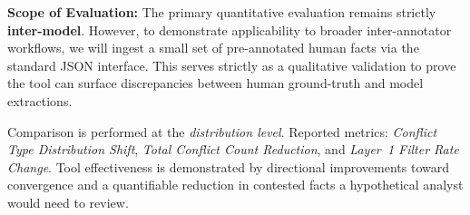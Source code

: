 \documentclass[11pt]{article}
\begin{document}
\textbf{Scope of Evaluation:} The primary quantitative evaluation remains strictly \textbf{inter-model}.
However, to demonstrate applicability to broader inter-annotator workflows, we will ingest a small set of pre-annotated human facts via the standard JSON interface.
This serves strictly as a qualitative validation to prove the tool can surface discrepancies between human ground-truth and model extractions.

Comparison is performed at the \textit{distribution level}. Reported metrics:
\textit{Conflict Type Distribution Shift},
\textit{Total Conflict Count Reduction}, and
\textit{Layer~1 Filter Rate Change}.
Tool effectiveness is demonstrated by directional improvements toward
convergence and a quantifiable reduction in contested facts a hypothetical analyst would need to review.
\end{document}
